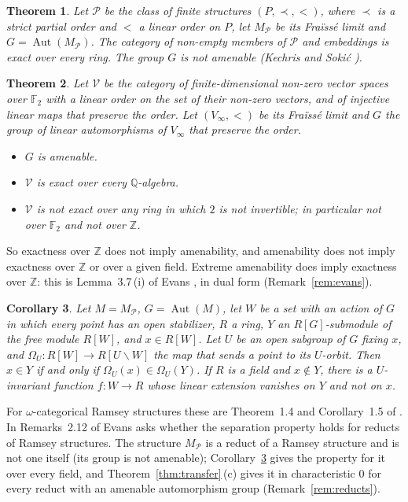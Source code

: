 \documentclass[11pt,a4paper]{article}
\newtheorem{theorem}{Theorem}[section]
\newtheorem{corollary}[theorem]{Corollary}
\theoremstyle{definition}
\newcommand{\V}{\mathcal{V}}
\newcommand{\Po}{\mathcal{P}}
\newcommand{\Z}{\mathbb{Z}}
\newcommand{\Q}{\mathbb{Q}}
\newcommand{\F}{\mathbb{F}}
\newcommand{\Aut}{\operatorname{Aut}}
\begin{document}
\begin{theorem}\label{thm:posets}
Let $\Po$ be the class of finite structures $(P,\prec,<)$, where $\prec$ is a
strict partial order and $<$ a linear order on $P$, let $M_{\Po}$ be its
Fra\"iss\'e limit and $G=\Aut(M_{\Po})$. The category of non-empty members of
$\Po$ and embeddings is exact over every ring. The group $G$ is not amenable
\textup{(}Kechris and Soki\'c \cite[Remark~3.2]{KS}\textup{)}.
\end{theorem}

\begin{theorem}\label{thm:vector}
Let $\V$ be the category of finite-dimensional non-zero vector spaces over
$\F_2$ with a linear order on the set of their non-zero vectors, and of
injective linear maps that preserve the order. Let $(V_\infty,<)$ be its
Fra\"iss\'e limit and $G$ the group of linear automorphisms of $V_\infty$ that
preserve the order.
\begin{itemize}
\item[\textup{(a)}] $G$ is amenable.
\item[\textup{(b)}] $\V$ is exact over every $\Q$-algebra.
\item[\textup{(c)}] $\V$ is not exact over any ring in which $2$ is not
invertible; in particular not over $\F_2$ and not over $\Z$.
\end{itemize}
\end{theorem}

So exactness over $\Z$ does not imply amenability, and amenability does not
imply exactness over $\Z$ or over a given field. Extreme amenability does
imply exactness over $\Z$: this is Lemma~3.7\,(i) of Evans \cite{Ev}, in
dual form (Remark~\ref{rem:evans}).

\begin{corollary}\label{cor:evans}
Let $M=M_{\Po}$, $G=\Aut(M)$, let $W$ be a set with an action of $G$ in which
every point has an open stabilizer, $R$ a ring, $Y$ an $R[G]$-submodule of
the free module $R[W]$, and $x\in R[W]$. Let $U$ be an open subgroup of $G$
fixing $x$, and $\Omega_U\colon R[W]\to R[U\backslash W]$ the map that sends
a point to its $U$-orbit. Then $x\in Y$ if and only if
$\Omega_U(x)\in\Omega_U(Y)$. If $R$ is a field and $x\notin Y$, there is a
$U$-invariant function $f\colon W\to R$ whose linear extension vanishes on
$Y$ and not on $x$.
\end{corollary}

For $\omega$-categorical Ramsey structures these are Theorem~1.4 and
Corollary~1.5 of \cite{Ev}. In Remarks~2.12 of \cite{Ev} Evans asks whether
the separation property holds for reducts of Ramsey structures. The
structure $M_{\Po}$ is a reduct of a Ramsey structure and is not one itself
(its group is not amenable); Corollary~\ref{cor:evans} gives the property for
it over every field, and Theorem~\ref{thm:transfer}\,(c) gives it in
characteristic $0$ for every reduct with an amenable automorphism group
(Remark~\ref{rem:reducts}).
\end{document}
